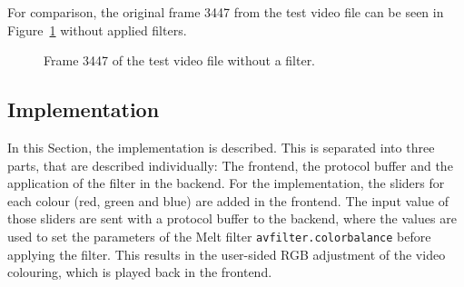 \documentclass[../MasterThesis.tex]{subfiles}
\begin{document}
For comparison, the original frame 3447 from the test video file can be seen in Figure~\ref{figure:septo_nofilter} without applied filters.

\begin{figure}[H]
	\begin{center}
		\caption[Frame 3447 of the test video file without a filter.]{Frame 3447 of the test video file without a filter.}
		\label{figure:septo_nofilter}
	\end{center}
\end{figure}












\subsection{Implementation} \label{subsection:implementation}

In this Section, the implementation is described. This is separated into three parts, that are described individually: The frontend, the protocol buffer and the application of the filter in the backend. For the implementation, the sliders for each colour (red, green and blue) are added in the frontend. The input value of those sliders are sent with a protocol buffer to the backend, where the values are used to set the parameters of the Melt filter \texttt{avfilter.colorbalance} before applying the filter. This results in the user-sided RGB adjustment of the video colouring, which is played back in the frontend.

\end{document}
